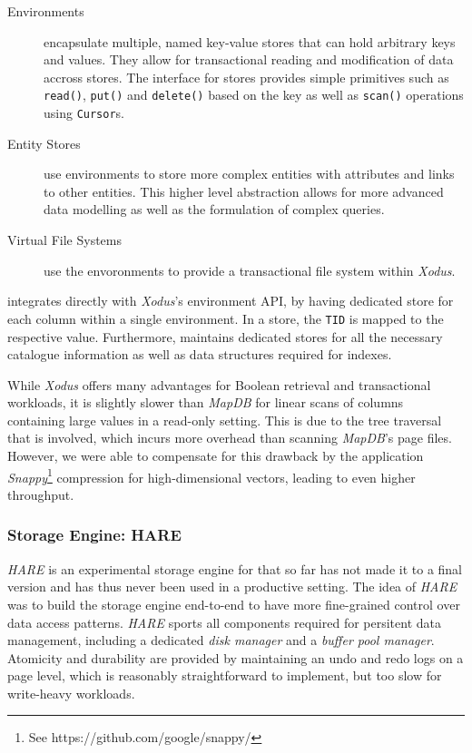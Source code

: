\begin{description}
    \item [Environments] encapsulate multiple, named key-value stores that can hold arbitrary keys and values. They allow for transactional reading and modification of data accross stores. The interface for stores provides simple primitives such as \texttt{read()}, \texttt{put()} and \texttt{delete()} based on the key as well as \texttt{scan()} operations using \texttt{Cursor}s.
    \item [Entity Stores] use environments to store more complex entities with attributes and links to other entities. This higher level abstraction allows for more advanced data modelling as well as the formulation of complex queries.
    \item [Virtual File Systems] use the envoronments to provide a transactional file system within \emph{Xodus}.
\end{description}

\cottontail{} integrates directly with \emph{Xodus}'s environment API, by having dedicated store for each column within a single environment. In a store, the \texttt{TID} is mapped to the respective value. Furthermore, \cottontail{} maintains dedicated stores for all the necessary catalogue information as well as data structures required for indexes.

While \emph{Xodus} offers many advantages for Boolean retrieval and transactional workloads, it is slightly slower than \emph{MapDB} for linear scans of columns containing large values in a read-only setting. This is due to the tree traversal that is involved, which incurs more overhead than scanning \emph{MapDB}'s page files. However, we were able to compensate for this drawback by the application \emph{Snappy}\footnote{See https://github.com/google/snappy/} compression for high-dimensional vectors, leading to even higher throughput.

\subsubsection{Storage Engine: HARE}

\emph{HARE} is an experimental storage engine for \cottontail{} that so far has not made it to a final version and has thus never been used in a productive setting. The idea of \emph{HARE} was to build the storage engine end-to-end to have more fine-grained control over data access patterns. \emph{HARE} sports all components required for persitent data management, including a dedicated \emph{disk manager} and a \emph{buffer pool manager}. Atomicity and durability are provided by maintaining an undo and redo logs on a page level, which is reasonably straightforward to implement, but too slow for write-heavy workloads.

